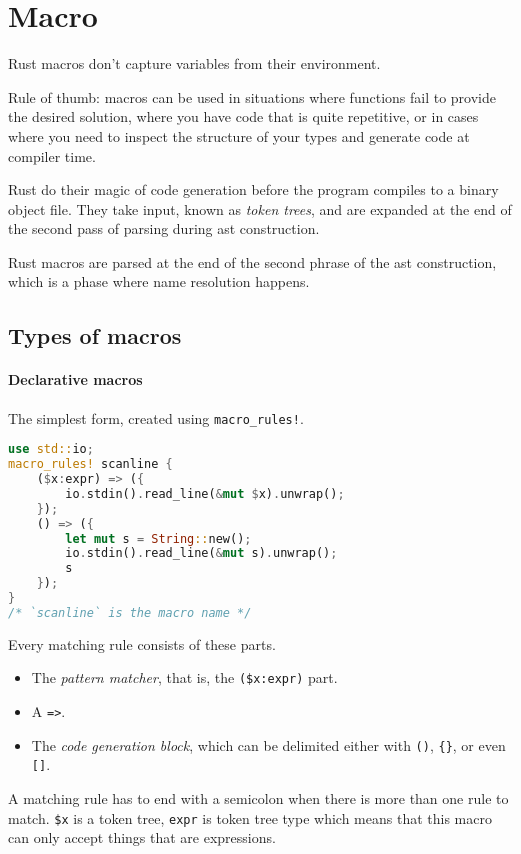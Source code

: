 \section{Macro}
Rust macros don't capture variables from their environment.

Rule of thumb: macros can be used in situations where functions fail to provide
the desired solution, where you have code that is quite repetitive, or in cases
where you need to inspect the structure of your types and generate code at
compiler time.

Rust do their magic of code generation before the program compiles to a binary
object file. They take input, known as \emph{token trees}, and are expanded at
the end of the second pass of parsing during \gls{ast} construction.

Rust macros are parsed at the end of the second phrase of the \gls{ast} 
construction, which is a phase where name resolution happens.

\subsection{Types of macros}
\paragraph{Declarative macros}
The simplest form, created using \verb"macro_rules!".
\begin{lstlisting}[language=rust, style=boxed]
use std::io;
macro_rules! scanline {
	($x:expr) => ({
		io.stdin().read_line(&mut $x).unwrap();
	});
	() => ({
		let mut s = String::new();
		io.stdin().read_line(&mut s).unwrap();
		s
	});
}
/* `scanline` is the macro name */
\end{lstlisting}

Every matching rule consists of these parts.
\begin{itemize}
	\item The \emph{pattern matcher}, that is, the \verb!($x:expr)!
		  part. 
	\item A \verb!=>!.
	\item The \emph{code generation block}, which can be delimited
		  either with \verb!()!, \verb!{}!, or even \verb![]!.
\end{itemize}

A matching rule has to end with a semicolon when there is more than one rule to
match. \verb!$x! is a token tree, \verb!expr! is token tree type which means
that this macro can only accept things that are expressions.

